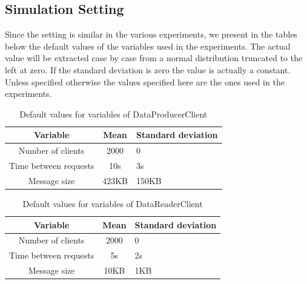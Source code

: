 \subsection{Simulation Setting}
\label{section:simulation_setting}
Since the setting is similar in the various experiments, we present in the tables below the default values of the variables used in the experiments. The actual value will be extracted case by case from a normal distribution truncated to the left at zero. If the standard deviation is zero the value is actually a constant. Unless specified otherwise the values specified here are the ones used in the experiments.

\begin{table}[H]
\centering
\begin{tabular}{|c|c|l|}
\rowcolor{bluepoli!40} %
\hline
\textbf{Variable}       & \textbf{Mean}   & \textbf{Standard deviation}    \\ \hline \hline
Number of clients       & 2000            & 0                              \\ \hline
Time between requests   & 10s             & 3s                             \\ \hline
Message size            & 423KB           & 150KB                          \\ \hline
\end{tabular}
\caption{Default values for variables of DataProducerClient}
\label{tab:default_setting_data_producer}
\end{table}

\begin{table}[H]
\centering
\begin{tabular}{|c|c|l|}
\rowcolor{bluepoli!40} %
\hline
\textbf{Variable}       & \textbf{Mean}   & \textbf{Standard deviation}   \\ \hline \hline
Number of clients       & 2000            & 0                             \\ \hline
Time between requests   & 5s              & 2s                            \\ \hline
Message size            & 10KB            & 1KB                           \\ \hline
\end{tabular}
\caption{Default values for variables of DataReaderClient}
\label{tab:default_setting_data_reader}
\end{table}

